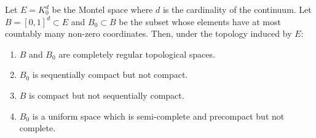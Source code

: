 Let $E = K_0^d$ be the Montel space where $d$ is the cardinality of the continuum. Let $B = [0, 1]^d \subset E$ and $B_0 \subset B$ be the subset whose elements have at most countably many non-zero coordinates. Then, under the topology induced by $E$:

\begin{enumerate}
\item $B$ and $B_0$ are completely regular topological spaces.
\item $B_0$ is sequentially compact but not compact.
\item $B$ is compact but not sequentially compact.
\item $B_0$ is a uniform space which is semi-complete and precompact but not complete.
\end{enumerate}
